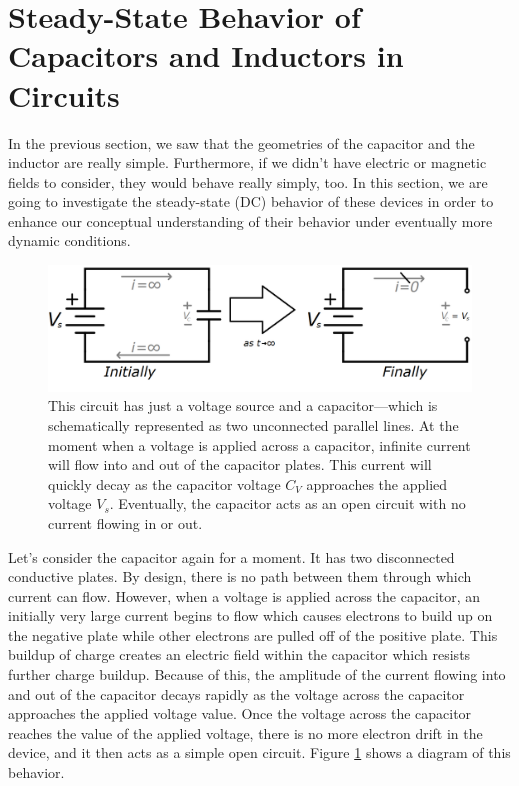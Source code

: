 \section{Steady-State Behavior of Capacitors and Inductors in Circuits}
In the previous section, we saw that the geometries of the capacitor and the inductor are really simple. Furthermore, if we didn't have electric or magnetic fields to consider, they would behave really simply, too. In this section, we are going to investigate the steady-state (DC) behavior of these devices in order to enhance our conceptual understanding of their behavior under eventually more dynamic conditions. 
\begin{figure}[h!]
\centering
\includegraphics[width=13cm]{figures/capAndVoltage.png}
\caption{This circuit has just a voltage source and a capacitor---which is schematically represented as two unconnected parallel lines. At the moment when a voltage is applied across a capacitor, infinite current will flow into and out of the capacitor plates. This current will quickly decay as the capacitor voltage $C_V$ approaches the applied voltage $V_s$. Eventually, the capacitor acts as an open circuit with no current flowing in or out.}
\label{capSteadyState}
\end{figure}
\par
Let's consider the capacitor again for a moment. It has two disconnected conductive plates. By design, there is no path between them through which current can flow. However, when a voltage is applied across the capacitor, an initially very large current begins to flow which causes electrons to build up on the negative plate while other electrons are pulled off of the positive plate. This buildup of charge creates an electric field within the capacitor which resists further charge buildup. Because of this, the amplitude of the current flowing into and out of the capacitor decays rapidly as the voltage across the capacitor approaches the applied voltage value. Once the voltage across the capacitor reaches the value of the applied voltage, there is no more electron drift in the device, and it then acts as a simple open circuit. Figure \ref{capSteadyState} shows a diagram of this behavior. 

